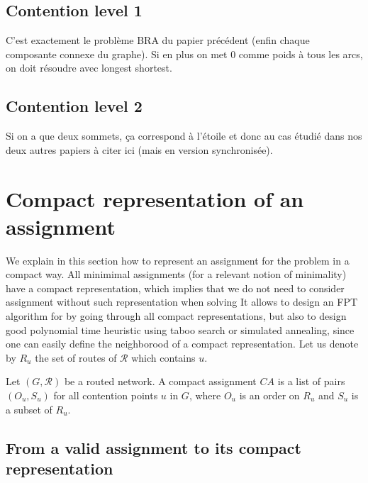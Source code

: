 \documentclass[english]{article}
\begin{document}
    

\subsection{Contention level 1}

C'est exactement le problème BRA du papier précédent (enfin chaque composante connexe du graphe).
Si en plus on met $0$ comme poids à tous les arcs, on doit résoudre avec longest shortest.

\subsection{Contention level 2}

Si on a que deux sommets, ça correspond à l'étoile et donc au cas étudié dans nos deux autres papiers à citer ici
(mais en version synchronisée). 

    






\section{Compact representation of an assignment}


We explain in this section how to represent an assignment for the problem 
\spall in a compact way. All minimimal assignments (for a relevant notion of minimality) have 
a compact representation, which implies that we do not need to consider assignment without such representation when solving \spall
It allows to design an FPT algorithm for \spall by going through all compact representations, but also to 
design good polynomial time heuristic using taboo search or simulated annealing, since one can easily define the neighborood of a compact representation. Let us denote by $R_u$ the set of routes of $\mathcal{R}$ which contains $u$.


\begin{definition}
Let $(G, \mathcal{R})$ be a routed network. A compact assignment $CA$ is a list of pairs $(O_u,S_u)$
for all contention points $u$ in $G$, where $O_u$ is an order on $R_u$ and $S_u$ is a subset of $R_u$.
\label{definition:compact}
\end{definition}


\subsection{From a valid assignment to its compact representation}
\end{document}
